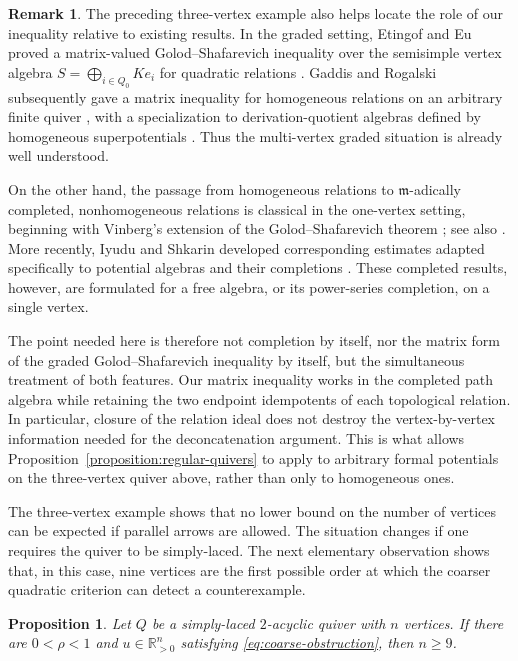 \documentclass[11pt,letterpaper,reqno]{amsart}
\newtheorem{proposition}[proposition]{Proposition}
\theoremstyle{definition}
\newtheorem{remark}[remark]{Remark}
\begin{document}
\begin{remark}
	The preceding three-vertex example also helps locate the role of our
	inequality relative to existing results.  In the graded setting,
	Etingof and Eu proved a matrix-valued Golod--Shafarevich inequality over
	the semisimple vertex algebra
	$S=\bigoplus_{i\in Q_0}Ke_i$ for quadratic relations
	\cite[Theorem~2.3.4]{EtingofEu}.  Gaddis and Rogalski subsequently gave a
	matrix inequality for homogeneous relations on an arbitrary finite quiver
	\cite[Proposition~3.5]{GaddisRogalski}, with a specialization to
	derivation-quotient algebras defined by homogeneous superpotentials
	\cite[Corollary~3.6]{GaddisRogalski}.  Thus the multi-vertex graded
	situation is already well understood.
	
	On the other hand, the passage from homogeneous relations to
	$\mathfrak m$-adically completed, nonhomogeneous relations is classical
	in the one-vertex setting, beginning with Vinberg's extension of the
	Golod--Shafarevich theorem
	\cite[Theorems~1 and~2]{Vinberg}; see also
	\cite[Theorems~4.6 and~4.7]{BrownWemyss}.  More recently, Iyudu and
	Shkarin developed corresponding estimates adapted specifically to
	potential algebras and their completions \cite{IyuduShkarin}.
	These completed results, however, are formulated for a free algebra, or
	its power-series completion, on a single vertex.
	
	The point needed here is therefore not completion by itself, nor the
	matrix form of the graded Golod--Shafarevich inequality by itself, but
	the simultaneous treatment of both features.  Our matrix inequality works
	in the completed path algebra while retaining the two endpoint
	idempotents of each topological relation.  In particular, closure of the
	relation ideal does not destroy the vertex-by-vertex information needed
	for the deconcatenation argument.  This is what allows
	Proposition~\ref{proposition:regular-quivers} to apply to arbitrary formal
	potentials on the three-vertex quiver above, rather than only to
	homogeneous ones.
\end{remark}

The three-vertex example shows that no lower bound on the number of vertices
can be expected if parallel arrows are allowed.  The situation changes if one
requires the quiver to be simply-laced.  The next elementary observation shows
that, in this case, nine vertices are the first possible order at which the
coarser quadratic criterion can detect a counterexample.

\begin{proposition}
	\label{proposition:coarse-minimality}
	Let $Q$ be a simply-laced $2$-acyclic quiver with $n$ vertices.  If there are
	$0<\rho<1$ and $u\in\mathbb R_{>0}^{n}$ satisfying
	\eqref{eq:coarse-obstruction}, then $n\geq9$.
\end{proposition}
\end{document}
